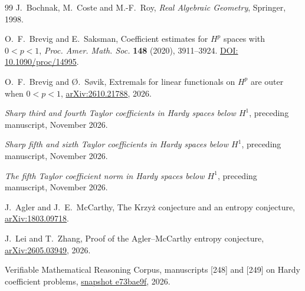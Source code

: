 \documentclass[11pt]{article}
\begin{document}
\small
\begin{thebibliography}{99}
\setlength{\itemsep}{2pt}
J.~Bochnak, M.~Coste and M.-F.~Roy, \emph{Real Algebraic Geometry},
Springer, 1998.

O.~F.~Brevig and E.~Saksman, Coefficient estimates for \(H^p\)
spaces with \(0<p<1\), \emph{Proc. Amer. Math. Soc.} \textbf{148}
(2020), 3911--3924.
\href{https://doi.org/10.1090/proc/14995}{DOI: 10.1090/proc/14995}.

O.~F.~Brevig and \O.~S{\o}vik, Extremals for linear functionals on
\(H^p\) are outer when \(0<p<1\),
\href{https://arxiv.org/abs/2610.21788}{arXiv:2610.21788}, 2026.

\emph{Sharp third and fourth Taylor coefficients in Hardy spaces
below \(H^1\)}, preceding manuscript, November 2026.

\emph{Sharp fifth and sixth Taylor coefficients in Hardy spaces
below \(H^1\)}, preceding manuscript, November 2026.

\emph{The fifth Taylor coefficient norm in Hardy spaces below
\(H^1\)}, preceding manuscript, November 2026.

J.~Agler and J.~E.~McCarthy, The Krzy\.z conjecture and an
entropy conjecture, \href{https://arxiv.org/abs/1803.09718}{arXiv:1803.09718}.

J.~Lei and T.~Zhang, Proof of the Agler--McCarthy entropy conjecture,
\href{https://arxiv.org/abs/2605.03949}{arXiv:2605.03949}, 2026.

Verifiable Mathematical Reasoning Corpus, manuscripts [248] and
[249] on Hardy coefficient problems,
\href{https://github.com/QEEDDD/Verifiable-Mathematical-Reasoning-Corpus/tree/e73bae9fd0c319129b19aacc5c317f7abf2865ef}{snapshot e73bae9f},
2026.
\end{thebibliography}
\end{document}
